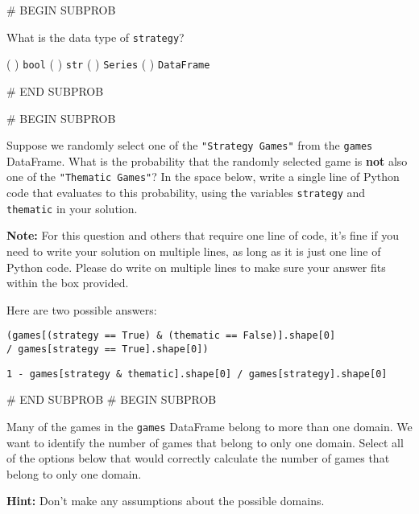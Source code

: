 \documentclass[twoside,12pt]{article}
\begin{document}
    # BEGIN SUBPROB


        What is the data type of \texttt{strategy}?

        \begin{center}
            ( ) \texttt{bool} 
            ( ) \texttt{str} 
            ( ) \texttt{Series} 
            ( ) \texttt{DataFrame} 
        \end{center}

    

# END SUBPROB

    # BEGIN SUBPROB


        
        Suppose we randomly select one of the \texttt{"Strategy Games"} from the \texttt{games} DataFrame. What is the probability that the randomly selected game is \textbf{not} also one of the \texttt{"Thematic Games"}? In the space below, write a single line of Python code that evaluates to this probability, using the variables \texttt{strategy} and \texttt{thematic} in your solution.

        \textbf{Note:} For this question and others that require one line of code, it's fine if you need to write your solution on multiple lines, as long as it is just one line of Python code. Please do write on multiple lines to make sure your answer fits within the box provided.

        \begin{responsebox}{2in}

            Here are two possible answers:
            
\texttt{(games[(strategy == True) \& (thematic == False)].shape[0]}\\
\texttt{/ games[strategy == True].shape[0])}    

\texttt{1 - games[strategy \& thematic].shape[0] / games[strategy].shape[0]}
           
        \end{responsebox}
        
    

# END SUBPROB
    # BEGIN SUBPROB


        Many of the games in the \texttt{games} DataFrame belong to more than one domain. We want to identify the number of games that belong to only one domain. Select all of the options below that would correctly calculate the number of games that belong to only one domain. 

        \textbf{Hint:} Don't make any assumptions about the possible domains.
\end{document}
